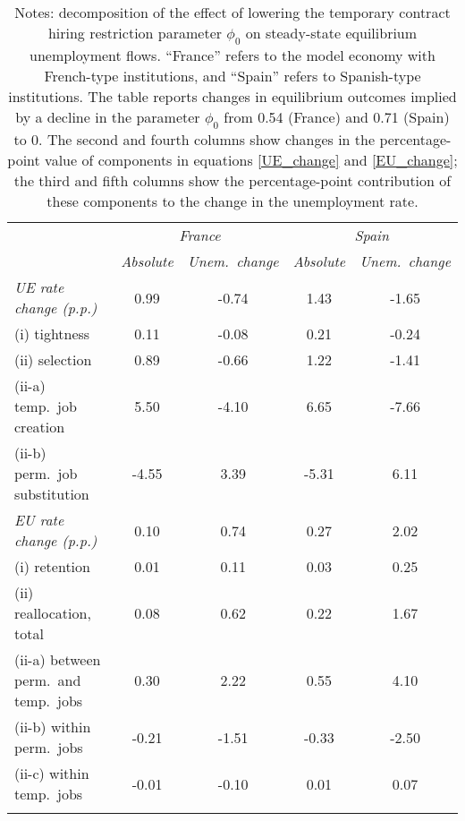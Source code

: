 \begin{table}[!h]
\centering
{}
\label{tab:flow_decomposition} 
\begin{tabular}{l c c c c}
\hline \hline
\addlinespace
 \hspace{100pt} &  \multicolumn{2}{c}{\textit{France}}  & \multicolumn{2}{c}{\textit{Spain}}  \\ 
    &  \textit{Absolute} &  \textit{Unem.\ change} & \textit{Absolute} & \textit{Unem.\ change} \\ 
\addlinespace
\textit{UE rate change (p.p.)}   &0.99 & -0.74 & 1.43 & -1.65\\
\hspace{2.5pt} (i) tightness  &0.11 & -0.08 & 0.21 & -0.24\\
\hspace{2.5pt} (ii) selection &0.89 & -0.66 & 1.22 & -1.41\\
\hspace{10pt} (ii-a) temp.\ job creation &5.50 & -4.10 & 6.65 & -7.66\\
\hspace{10pt} (ii-b) perm.\ job substitution &-4.55 & 3.39 & -5.31 & 6.11\\
\addlinespace
\textit{EU rate change (p.p.)}   &0.10 & 0.74 & 0.27 & 2.02\\
\hspace{2.5pt} (i) retention &0.01 & 0.11 & 0.03 & 0.25\\
\hspace{2.5pt} (ii) reallocation, total &0.08 & 0.62 & 0.22 & 1.67\\
\hspace{10pt} (ii-a) between perm.\ and temp.\ jobs &0.30 & 2.22 & 0.55 & 4.10\\
\hspace{10pt} (ii-b) within perm.\ jobs &-0.21 & -1.51 & -0.33 & -2.50\\
\hspace{10pt} (ii-c) within temp.\ jobs &-0.01 & -0.10 & 0.01 & 0.07\\
\addlinespace
\hline \hline
\end{tabular}
\caption*{ \footnotesize Notes: decomposition of the effect of lowering the temporary contract hiring restriction parameter
$\phi_0$ on steady-state equilibrium unemployment flows. ``France'' refers to the model economy with French-type institutions, and 
``Spain'' refers to Spanish-type institutions. The table reports changes in equilibrium outcomes implied by a decline in the parameter
$\phi_0$ from 0.54 (France) and 0.71 (Spain) to 0. The second and fourth columns show changes in the percentage-point value of components in 
equations \ref{UE_change} and \ref{EU_change}; the third and fifth columns show the percentage-point contribution of these components to 
the change in the unemployment rate. }
\end{table}